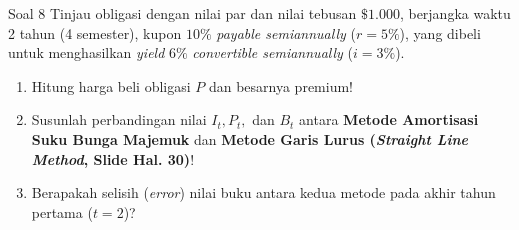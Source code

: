 \documentclass[11pt,a4paper]{article}
\begin{document}
\begin{problembox}{Soal 8}
Tinjau obligasi dengan nilai par dan nilai tebusan $\$1.000$, berjangka waktu 2 tahun (4 semester), kupon $10\%$ \textit{payable semiannually} ($r = 5\%$), yang dibeli untuk menghasilkan \textit{yield} $6\%$ \textit{convertible semiannually} ($i = 3\%$).
\begin{enumerate}[label=(\alph*)]
    \item Hitung harga beli obligasi $P$ dan besarnya premium!
    \item Susunlah perbandingan nilai $I_t, P_t,$ dan $B_t$ antara \textbf{Metode Amortisasi Suku Bunga Majemuk} dan \textbf{Metode Garis Lurus (\textit{Straight Line Method}, Slide Hal. 30)}!
    \item Berapakah selisih (\textit{error}) nilai buku antara kedua metode pada akhir tahun pertama ($t = 2$)?
\end{enumerate}
\end{problembox}
\end{document}
